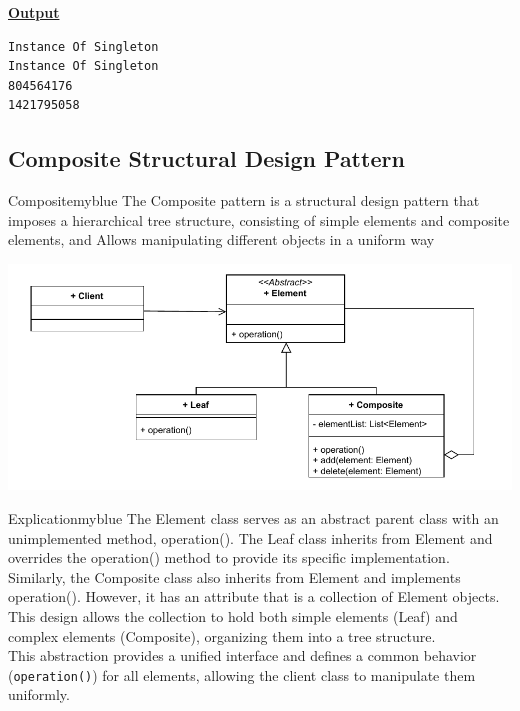 \vspace{1cm}

\textbf{\underline{Output}}
\vspace{0.1cm}
\begin{lstlisting}[style=cmd]
Instance Of Singleton
Instance Of Singleton
804564176
1421795058
\end{lstlisting}





\newpage
\subsection{Composite Structural Design Pattern}
\begin{prettyBox}{Composite}{myblue}
The Composite pattern is a structural design pattern that imposes a
hierarchical tree structure, consisting of simple elements and composite elements, and 
Allows manipulating different objects in a uniform way
\end{prettyBox}

\vspace{1cm}


\begin{center}
\includegraphics[height=0.22\textheight]{Chapters/DesignPattern/Composite/comp1.drawio.pdf}
\end{center}

\vspace{1cm}

\begin{prettyBox}{Explication}{myblue}
The Element class serves as an abstract parent class with an unimplemented method, operation().  
The Leaf class inherits from Element and overrides the operation() method to provide its specific implementation.  
Similarly, the Composite class also inherits from Element and implements operation(). However, it has an attribute that is a collection of Element objects.  
This design allows the collection to hold both simple elements (Leaf) and complex elements (Composite), organizing them into a tree structure.\\[0.1cm]
This abstraction provides a unified interface and defines a common behavior (\texttt{operation()}) 
for all elements, allowing the client class to manipulate them uniformly.
\end{prettyBox}

